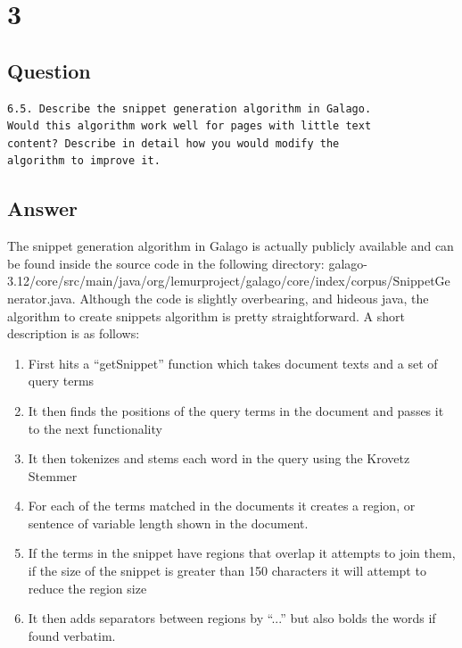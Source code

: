 \documentclass[letterpaper,11pt]{article}
\begin{document}
\clearpage


\section*{3}

\subsection*{Question}

\begin{verbatim}
6.5. Describe the snippet generation algorithm in Galago. 
Would this algorithm work well for pages with little text 
content? Describe in detail how you would modify the 
algorithm to improve it.
\end{verbatim}

\subsection*{Answer}

The snippet generation algorithm in Galago is actually publicly available and can be found inside the source code in the following directory: {galago-3.12/core/src/main/java/org/lemurproject/galago/core/index/corpus/SnippetGenerator.java}.
Although the code is slightly overbearing, and hideous java, the algorithm to create snippets algorithm is pretty straightforward.
A short description is as follows:

\begin{enumerate}
  \item First hits a ``getSnippet'' function which takes document texts and a set of query terms
  \item It then finds the positions of the query terms in the document and passes it to the next functionality
  \item It then tokenizes and stems each word in the query using the Krovetz Stemmer
  \item For each of the terms matched in the documents it creates a region, or sentence of variable length shown in the document.
  \item If the terms in the snippet have regions that overlap it attempts to join them, if the size of the snippet is greater than 150 characters it will attempt to reduce the region size
  \item It then adds separators between regions by ``...'' but also bolds the words if found verbatim.
\end{enumerate}
\end{document}
